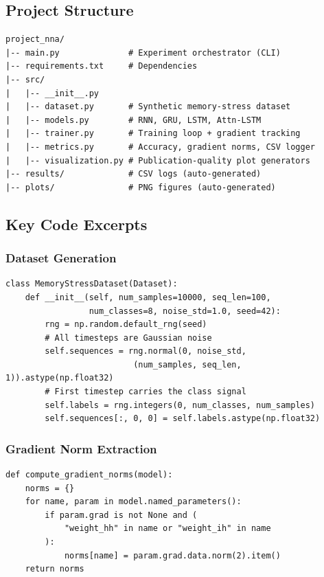 \documentclass[12pt, a4paper]{article}
\begin{document}
\subsection{Project Structure}

\begin{lstlisting}[language={}, basicstyle=\ttfamily\small, frame=single, caption={Modular project directory layout.}, label={lst:structure}]
project_nna/
|-- main.py              # Experiment orchestrator (CLI)
|-- requirements.txt     # Dependencies
|-- src/
|   |-- __init__.py
|   |-- dataset.py       # Synthetic memory-stress dataset
|   |-- models.py        # RNN, GRU, LSTM, Attn-LSTM
|   |-- trainer.py       # Training loop + gradient tracking
|   |-- metrics.py       # Accuracy, gradient norms, CSV logger
|   |-- visualization.py # Publication-quality plot generators
|-- results/             # CSV logs (auto-generated)
|-- plots/               # PNG figures (auto-generated)
\end{lstlisting}

\subsection{Key Code Excerpts}

\subsubsection{Dataset Generation}

\begin{lstlisting}[caption={Synthetic memory stress sequence generation (simplified).}, label={lst:dataset}]
class MemoryStressDataset(Dataset):
    def __init__(self, num_samples=10000, seq_len=100,
                 num_classes=8, noise_std=1.0, seed=42):
        rng = np.random.default_rng(seed)
        # All timesteps are Gaussian noise
        self.sequences = rng.normal(0, noise_std,
                          (num_samples, seq_len, 1)).astype(np.float32)
        # First timestep carries the class signal
        self.labels = rng.integers(0, num_classes, num_samples)
        self.sequences[:, 0, 0] = self.labels.astype(np.float32)
\end{lstlisting}

\subsubsection{Gradient Norm Extraction}

\begin{lstlisting}[caption={Extracting recurrent weight gradient $L_2$-norms after backward pass.}, label={lst:gradnorm}]
def compute_gradient_norms(model):
    norms = {}
    for name, param in model.named_parameters():
        if param.grad is not None and (
            "weight_hh" in name or "weight_ih" in name
        ):
            norms[name] = param.grad.data.norm(2).item()
    return norms
\end{lstlisting}
\end{document}
